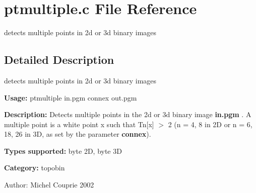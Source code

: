 \section{ptmultiple.c File Reference}
\label{ptmultiple_8c}
detects multiple points in 2d or 3d binary images  




\label{_details}
\subsection{Detailed Description}
detects multiple points in 2d or 3d binary images 

{\bf Usage:} ptmultiple in.pgm connex out.pgm

{\bf Description:} Detects multiple points in the 2d or 3d binary image {\bf in.pgm} . A multiple point is a white point x such that Tn[x] $>$ 2 (n = 4, 8 in 2D or n = 6, 18, 26 in 3D, as set by the parameter {\bf connex}).

{\bf Types supported:} byte 2D, byte 3D

{\bf Category:} topobin

\begin{Desc}
\item[Author:]Michel Couprie 2002 \end{Desc}
